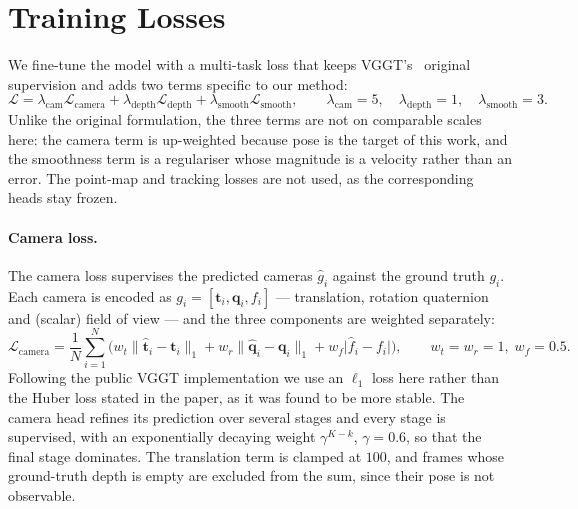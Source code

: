 \documentclass[11pt]{article}
\begin{document}
\nocite{stoyanov2012surgical}
\nocite{allan2021scared}
\nocite{wang2025vggt}
\nocite{zhang2025monst3r}
\nocite{eigen2014depth}
\nocite{sturm2012benchmark}
\nocite{fang2020goodpractice}
\nocite{godard2019monodepth2}
\nocite{ozyoruk2021endosfm}
\nocite{shao2022afsfmlearner}
\nocite{zeinoddin2024dares}
\nocite{cui2024endodac}
\nocite{zeinoddin2025endofast3r}
\nocite{zhang2026endosfm3d}
\nocite{chang2026esrt}
\nocite{wang2024dust3r}


\section*{Training Losses}

We fine-tune the model with a multi-task loss that keeps VGGT's~\cite{wang2025vggt} original
supervision and adds
two terms specific to our method:
\begin{equation}
  \mathcal{L} = \lambda_{\text{cam}} \mathcal{L}_{\text{camera}}
              + \lambda_{\text{depth}} \mathcal{L}_{\text{depth}}
              + \lambda_{\text{smooth}} \mathcal{L}_{\text{smooth}},
  \qquad
  \lambda_{\text{cam}} = 5,\quad
  \lambda_{\text{depth}} = 1,\quad
  \lambda_{\text{smooth}} = 3 .
\end{equation}
Unlike the original formulation, the three terms are not on comparable scales here: the
camera term is up-weighted because pose is the target of this work, and the smoothness term
is a regulariser whose magnitude is a velocity rather than an error. The point-map and
tracking losses are not used, as the corresponding heads stay frozen.

\paragraph{Camera loss.}
The camera loss supervises the predicted cameras $\hat{g}_i$ against the ground truth $g_i$.
Each camera is encoded as $g_i = [\mathbf{t}_i, \mathbf{q}_i, f_i]$ --- translation,
rotation quaternion and (scalar) field of view --- and the three components are weighted
separately:
\begin{equation}
  \mathcal{L}_{\text{camera}}
  = \frac{1}{N} \sum_{i=1}^{N}
    \Big( w_{t}\big\|\hat{\mathbf{t}}_i - \mathbf{t}_i\big\|_{1}
        + w_{r}\big\|\hat{\mathbf{q}}_i - \mathbf{q}_i\big\|_{1}
        + w_{f}\big|\hat{f}_i - f_i\big| \Big),
  \qquad w_t = w_r = 1,\; w_f = 0.5 .
\end{equation}
Following the public VGGT implementation we use an $\ell_1$ loss here rather than the Huber
loss stated in the paper, as it was found to be more stable. The camera head refines its
prediction over several stages and every stage is supervised, with an exponentially decaying
weight $\gamma^{K-k}$, $\gamma = 0.6$, so that the final stage dominates. The translation term
is clamped at $100$, and frames whose ground-truth depth is empty are excluded from the sum,
since their pose is not observable.
\end{document}
